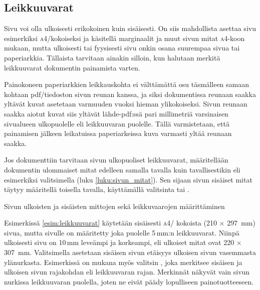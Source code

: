 \subsection{Leikkuuvarat}

Sivu voi olla ulkoisesti erikokoinen kuin sisäisesti. On siis
mahdollista asettaa sivu esimerkiksi \textsc{a4}\-/kokoiseksi ja
käsitellä marginaalit ja muut sivun mitat \textsc{a4}-koon mukaan, mutta
ulkoisesti tai fyysisesti sivu onkin osana suurempaa sivua tai
paperi\-arkkia. Tällaista tarvitaan ainakin silloin, kun halutaan
merkitä leikkuuvarat dokumentin painamista varten.

Painokoneen paperi\-arkkien leikkauskohta ei välttämättä osu täsmälleen
samaan kohtaan pdf\-/tiedoston sivun reunan kanssa, ja siksi
dokumentissa reunaan saakka yltävät kuvat asetetaan varmuuden vuoksi
hieman ylikokoiseksi. Sivun reunaan saakka aiotut kuvat siis yltävät
lähde-pdf:ssä pari millimetriä varsinaisen sivu\-alueen ulkopuolelle eli
leikkuuvaran puolelle. Tällä varmistetaan, että painamisen jälkeen
leikatuissa paperi\-arkeissa kuva varmasti yltää reunaan saakka.

Jos dokumenttiin tarvitaan sivun ulkopuoliset leikkuuvarat, määritellään
dokumentin ulommaiset mitat edelleen samalla tavalla kuin
tavallisestikin eli esimerkiksi valitsimella  (luku
\ref{luku:sivun_mitat}).  
Sen sijaan sivun sisäiset mitat täytyy määritellä toisella tavalla,
käyttämällä valitsinta  tai .

\begin{esimerkki*}
\begin{koodilohko}
\end{koodilohko}
\caption{Sivun ulkoisten ja sisäisten mittojen sekä leikkuvaarojen
  määrittäminen}
\label{esim:leikkuuvarat}
\end{esimerkki*}

Esimerkissä \ref{esim:leikkuuvarat} käytetään sisäisesti \textsc{a4}\-/
kokoista (210 × 297~mm) sivua, mutta sivulle on määritetty joka puolelle
5\,mm:n leikkuuvarat. Niinpä ulkoisesti sivu on 10\,mm leveämpi ja
korkeampi, eli ulkoiset mitat ovat 220 × 307~mm. Valitsimella
 asetetaan sisäisen sivun etäisyys ulkoisen sivun
vasemmasta ylänurkasta. Esimerkissä on mukana myös valitsin
, joka merkitsee sisäisen ja ulkoisen sivun rajakohdan
eli leikkuuvaran rajan. Merkinnät näkyvät vain sivun nurkissa
leikkuuvaran puolella, joten ne eivät päädy lopulliseen
painotuotteeseen.

